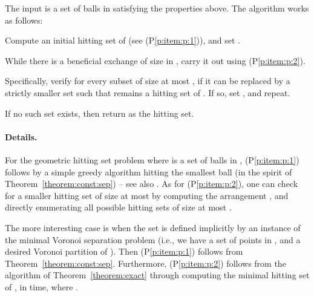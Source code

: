 \InSubmitVer{\documentclass[11pt]{article}}
\numberwithin{figure}{section}
\numberwithin{table}{section}
\numberwithin{equation}{section}
\newcommand{\thmref}[1]{Theorem~\ref{theorem:#1}}
\newcommand{\thmrefpage}[1]{Theorem~\ref{theorem:#1}}
\newcommand{\pitemref}[1]{(P\ref{p:item:#1})}
\begin{document}
The input is a set  of balls in  satisfying the
properties above. The algorithm works as follows:
\smallskip \begin{compactenum}[\quad(A)]
    \item Compute an initial hitting set  of  (see
    \pitemref{p:1}), and set .
    
    \item While there is a beneficial exchange of size  in , carry it out using \pitemref{p:2}.
    
    Specifically, verify for every subset  of
    size at most , if it can be replaced by a strictly smaller
    set  such that 
    remains a hitting set of . If so, set , and repeat.

    \item If no such set exists, then return  as the hitting
    set.
\end{compactenum}




\paragraph{Details.}

For the geometric hitting set problem where  is a set of
 balls in , \pitemref{p:1} follows by a simple greedy
algorithm hitting the smallest ball (in the spirit of
\thmrefpage{const:sep}) -- see also \cite{c-ptasp-03}. As for
\pitemref{p:2}, one can check for a smaller hitting set of size at
most  by computing the arrangement , and
directly enumerating all possible hitting sets of size at most
.

The more interesting case is when the set  is defined
implicitly by an instance of the minimal Voronoi separation problem
(i.e., we have a set  of  points in , and a desired
Voronoi partition  of ).  Then
\pitemref{p:1} follows from \thmref{const:sep}. Furthermore,
\pitemref{p:2} follows from the algorithm of \thmrefpage{exact} through
computing the minimal hitting set  of
, in  time, where
.
\end{document}
